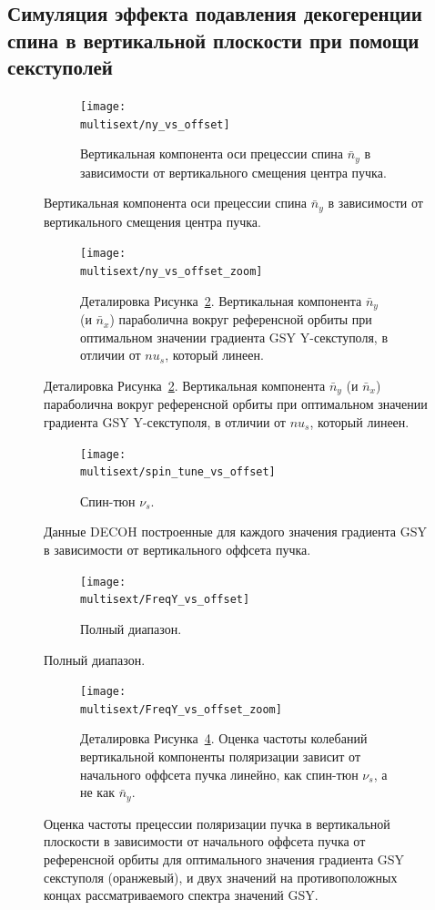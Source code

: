 \documentclass{report}
\newcommand{\Artem}{/Users/alexaksentyev/REPOS/COSYINF/img/Artem}
\newcommand{\multisext}{\Artem/multisext_test}
\begin{document}
\subsection{Симуляция эффекта подавления декогеренции спина в вертикальной плоскости при помощи секступолей}
\begin{figure}[H]
  \centering
  \begin{subfigure}[b]{\textwidth}
    \texttt{[image: \\multisext/ny\_vs\_offset]}
    \caption{Вертикальная компонента оси прецессии спина $\bar n_y$ в зависимости
      от вертикального смещения центра пучка.\label{fig:DECOH_full_ny}}
  \end{subfigure}
\end{figure}
\begin{figure}[H]\ContinuedFloat
  \begin{subfigure}[b]{\textwidth}
    \texttt{[image: \\multisext/ny\_vs\_offset\_zoom]}
    \caption{Деталировка Рисунка~\ref{fig:DECOH_full_ny}. Вертикальная компонента $\bar
      n_y$ (и $\bar n_x$) параболична вокруг референсной орбиты при
      оптимальном значении градиента GSY Y-секступоля, в отличии от
      $nu_s$, который линеен.}
  \end{subfigure}
\end{figure}
\begin{figure}[H]\ContinuedFloat
  \centering
  \begin{subfigure}[b]{\textwidth}
    \texttt{[image: \\multisext/spin\_tune\_vs\_offset]}
    \caption{Спин-тюн $\nu_s$.}
  \end{subfigure}
  \caption{Данные DECOH построенные для каждого значения градиента GSY
    в зависимости от вертикального оффсета пучка.}
\end{figure}

\begin{figure}[H]
  \centering
  \begin{subfigure}[b]{\textwidth}
    \texttt{[image: \\multisext/FreqY\_vs\_offset]}
    \caption{Полный диапазон.\label{fig:FreqY_vs_offset}}
  \end{subfigure}
\end{figure}
\begin{figure}[H]\ContinuedFloat
  \begin{subfigure}[b]{\textwidth}
    \texttt{[image: \\multisext/FreqY\_vs\_offset\_zoom]}
    \caption{Деталировка Рисунка~\ref{fig:FreqY_vs_offset}. Оценка
      частоты колебаний вертикальной компоненты поляризации зависит от
      начального оффсета пучка линейно, как спин-тюн $\nu_s$, а не как $\bar n_y$.}
  \end{subfigure}
  \caption{Оценка частоты прецессии поляризации пучка в вертикальной
    плоскости в зависимости от начального оффсета пучка от референсной
    орбиты для оптимального значения градиента GSY секступоля
    (оранжевый), и двух значений на противоположных концах
    рассматриваемого спектра значений GSY.}
\end{figure}
\end{document}
